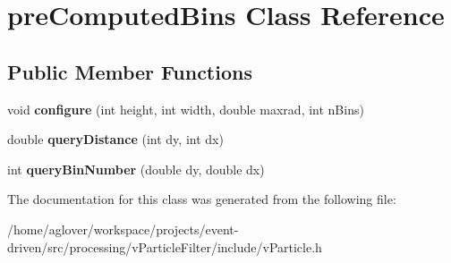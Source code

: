 \hypertarget{classpreComputedBins}{}\section{pre\+Computed\+Bins Class Reference}
\label{classpreComputedBins}
\subsection*{Public Member Functions}
\begin{DoxyCompactItemize}
\item 
void {\bfseries configure} (int height, int width, double maxrad, int n\+Bins)\hypertarget{classpreComputedBins_af0d406410d46d3eddcb766987f926017}{}\label{classpreComputedBins_af0d406410d46d3eddcb766987f926017}

\item 
double {\bfseries query\+Distance} (int dy, int dx)\hypertarget{classpreComputedBins_aa40481ace2002018d665d1909a09f7b4}{}\label{classpreComputedBins_aa40481ace2002018d665d1909a09f7b4}

\item 
int {\bfseries query\+Bin\+Number} (double dy, double dx)\hypertarget{classpreComputedBins_ac54c38ccabf80894345145b6bc0bf508}{}\label{classpreComputedBins_ac54c38ccabf80894345145b6bc0bf508}

\end{DoxyCompactItemize}


The documentation for this class was generated from the following file\+:\begin{DoxyCompactItemize}
\item 
/home/aglover/workspace/projects/event-\/driven/src/processing/v\+Particle\+Filter/include/v\+Particle.\+h\end{DoxyCompactItemize}
